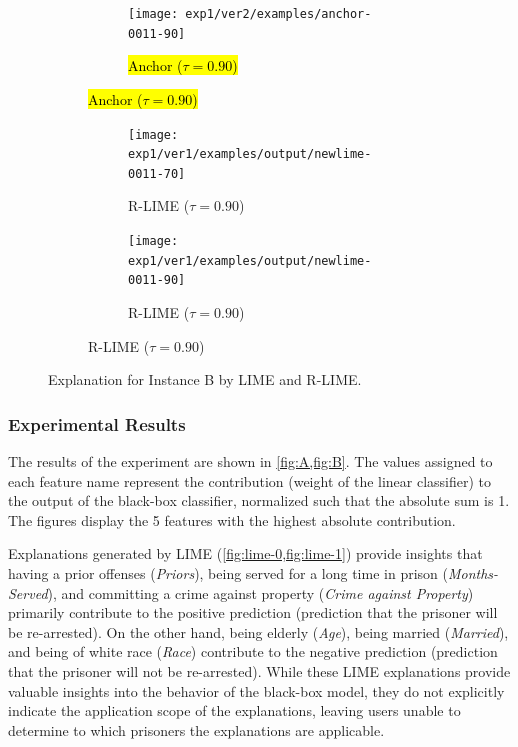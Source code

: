 \documentclass[runningheads]{llncs}
\begin{document}
{{\begin{figure}[t]
\begin{subfigure}[t]{0.45\textwidth}
        \vspace{10pt}
        \begin{subfigure}[t]{\textwidth}
          \centering
          \texttt{[image: exp1/ver2/examples/anchor-0011-90]}  %
          \caption{\hl{Anchor ($\tau=0.90$)}}
          \vspace{1.0em}
        \end{subfigure}
      \end{subfigure}
      \hfill
      \begin{subfigure}[t]{0.45\textwidth}
        \begin{subfigure}[t]{\textwidth}
          \hspace{-5pt}
          \texttt{[image: exp1/ver1/examples/output/newlime-0011-70]}  %
          \caption{R-LIME ($\tau=0.90$)}
        \end{subfigure}
        \begin{subfigure}[t]{\textwidth}
          \hspace{-20pt}
          \texttt{[image: exp1/ver1/examples/output/newlime-0011-90]}  %
          \caption{R-LIME ($\tau=0.90$)}\label{fig:rlime-1-90}
        \end{subfigure}
      \end{subfigure}
      \caption[Explanation for Instance B by LIME and R-LIME]{%
        Explanation for Instance B by LIME and R-LIME\@.
      }\label{fig:B}
    \end{figure}
  }

\subsubsection{Experimental Results}
The results of the experiment are shown in \cref{fig:A,fig:B}.
The values assigned to each feature name represent the contribution
(weight of the linear classifier)
to the output of the black-box classifier,
normalized such that the absolute sum is 1.
The figures display the 5 features with the highest absolute contribution.

Explanations generated by LIME (\cref{fig:lime-0,fig:lime-1}) provide insights
that having a prior offenses (\emph{Priors}),
being served for a long time in prison (\emph{Months-Served}),
and committing a crime against property (\emph{Crime against Property})
primarily contribute to the positive prediction
(prediction that the prisoner will be re-arrested).
On the other hand,
being elderly (\emph{Age}), being married (\emph{Married}),
and being of white race (\emph{Race}) contribute to the negative prediction
(prediction that the prisoner will not be re-arrested).
While these LIME explanations provide valuable insights into the behavior of
the black-box model,
they do not explicitly indicate the application scope of the explanations,
leaving users unable to determine to which prisoners the explanations are applicable.

}
\end{document}

